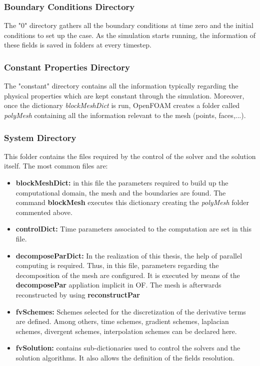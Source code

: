 \subsubsection{Boundary Conditions Directory}

\setlength{\parindent}{0.5cm} The "0" directory gathers all the boundary conditions at time zero and the initial conditions to set up the case. As the simulation starts running, the information of these fields is saved in folders at every timestep.

\subsubsection{Constant Properties Directory}

\setlength{\parindent}{0.5cm} The "constant" directory contains all the information typically regarding the physical properties which are kept constant through the simulation. Moreover, once the dictionary \textit{blockMeshDict} is run, OpenFOAM creates a folder called \textit{polyMesh} containing all the information relevant to the mesh (points, faces,...). 

\subsubsection{System Directory}
\setlength{\parindent}{0.5cm} This folder contains the files required by the control of the solver and the solution itself. The most common files are:
\begin{itemize}
	\item \textbf{blockMeshDict:} in this file the parameters required to build up the computational domain, the mesh and the boundaries are found. The command \textbf{blockMesh} executes this dictionary creating the \textit{polyMesh} folder commented above.
	\item \textbf{controlDict:} Time parameters associated to the computation are set in this file. 
	\item \textbf{decomposeParDict:} In the realization of this thesis, the help of parallel computing is required. Thus, in this file, parameters regarding the decomposition of the mesh are configured. It is executed by means of the \textbf{decomposePar} appliation implicit in OF. The mesh is afterwards reconstructed by using \textbf{reconstructPar} 
	\item \textbf{fvSchemes:} Schemes selected for the discretization of the derivative terms are defined. Among others, time schemes, gradient schemes, laplacian schemes, divergent schemes, interpolation schemes can be declared here.
	\item \textbf{fvSolution:} contains sub-dictionaries used to control the solvers and the solution algorithms. It also allows the definition of the fields resolution.
\end{itemize}
\clearpage
